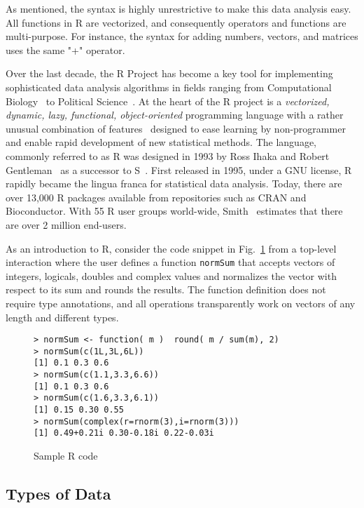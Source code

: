 \documentclass[acmsmall,10pt,review,anonymous]{acmart}\settopmatter{printfolios=true,printccs=false,printacmref=false}
\newcommand{\code}[1]{\lstinline|#1|\xspace}
\begin{document}
As mentioned, the syntax is highly unrestrictive to make this data analysis easy.
All functions in R are vectorized, and consequently operators and functions are multi-purpose.
For instance, the syntax for adding numbers, vectors, and matrices uses the same "+" operator.

Over the last decade, the R Project has become a key tool for implementing
sophisticated data analysis algorithms in fields ranging from Computational
Biology~\cite{R05} to Political Science~\cite{R:Keele:2008}. At the heart of
the R project is a \emph{vectorized, dynamic, lazy, functional,
  object-oriented} programming language with a rather unusual combination of
features~\cite{ecoop12} designed to ease learning by non-programmer and
enable rapid development of new statistical methods.  The language, commonly
referred to as R was designed in 1993 by Ross Ihaka and Robert
Gentleman~\cite{R96} as a successor to S~\cite{S88}.  First released in
1995, under a GNU license, R rapidly became the lingua franca for
statistical data analysis. Today, there are over 13,000 R packages available
from repositories such as CRAN and Bioconductor.  With 55 R user groups
world-wide, Smith~\cite{eco11} estimates that there are over 2 million
end-users.


As an introduction to R, consider the code snippet in Fig.~\ref{sample} from
a top-level interaction where the user defines a function \code{normSum}
that accepts vectors of integers, logicals, doubles and complex values and
normalizes the vector with respect to its sum and rounds the results. The
function definition does not require type annotations, and all operations
transparently work on vectors of any length and different types.

\begin{figure}{\small
\begin{lstlisting}[style=R]
> normSum <- function( m )  round( m / sum(m), 2)
> normSum(c(1L,3L,6L))
[1] 0.1 0.3 0.6
> normSum(c(1.1,3.3,6.6))
[1] 0.1 0.3 0.6
> normSum(c(1.6,3.3,6.1))
[1] 0.15 0.30 0.55
> normSum(complex(r=rnorm(3),i=rnorm(3)))
[1] 0.49+0.21i 0.30-0.18i 0.22-0.03i
\end{lstlisting}}
\caption{Sample R code}\label{sample}
\end{figure}

\subsection{Types of Data}
\end{document}
